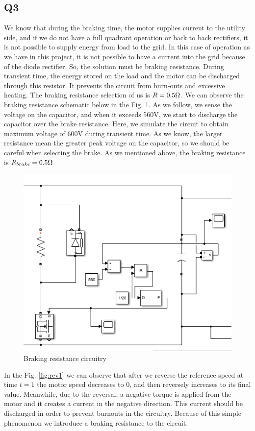 \subsection{Q3}

We know that during the braking time, the motor supplies current to the utility side, and if we do not have a full quadrant operation or back to back rectifiers, it is not possible to supply energy from load to the grid. In this case of operation as we have in this project, it is not possible to have a current into the grid because of the diode rectifier. So, the solution must be braking resistance. During transient time, the energy stored on the load and the motor can be discharged through this resistor. It prevents the circuit from burn-outs and excessive heating. The braking resistance selection of us is $R = 0.5 \ohm$. We can observe the braking resistance schematic below in the Fig. \ref{fig:brake}. As we follow, we sense the voltage on the capacitor, and when it exceeds 560V, we start to discharge the capacitor over the brake resistance. Here, we simulate the circuit to obtain maximum voltage of 600V during transient time. As we know, the larger resistance mean the greater peak voltage on the capacitor, so we should be careful when selecting the brake. As we mentioned above, the braking resistance is $R_{brake} = 0.5\ohm$

\begin{center}
\begin{figure}[H]
\centering
\includegraphics [width= 8 cm]{figs/brake.png}
\caption{Braking resistance circuitry}
\label{fig:brake}
\end{figure}
\end{center}

In the Fig. \ref{fig:rev1} we can observe that after we reverse the reference speed at time $t=1$ the motor speed decreases to 0, and then reversely increases to its final value. Meanwhile, due to the reversal, a negative torque is applied from the motor and it creates a current in the negative direction. This current should be discharged in order to prevent burnouts in the circuitry. Because of this simple phenomenon we introduce a braking resistance to the circuit.

